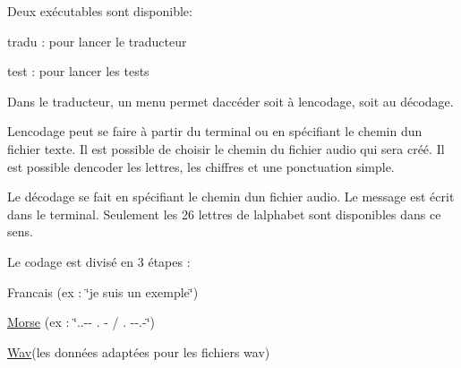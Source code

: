 Deux exécutables sont disponible\+:
\begin{DoxyItemize}
\item tradu \+: pour lancer le traducteur
\item test \+: pour lancer les tests
\end{DoxyItemize}

Dans le traducteur, un menu permet d\textquotesingle{}accéder soit à l\textquotesingle{}encodage, soit au décodage.

L\textquotesingle{}encodage peut se faire à partir du terminal ou en spécifiant le chemin d\textquotesingle{}un fichier texte. Il est possible de choisir le chemin du fichier audio qui sera créé. Il est possible d\textquotesingle{}encoder les lettres, les chiffres et une ponctuation simple.

Le décodage se fait en spécifiant le chemin d\textquotesingle{}un fichier audio. Le message est écrit dans le terminal. Seulement les 26 lettres de l\textquotesingle{}alphabet sont disponibles dans ce sens.

Le codage est divisé en 3 étapes \+:
\begin{DoxyItemize}
\item Francais (ex \+: \char`\"{}je suis un exemple\char`\"{})
\item \mbox{\hyperlink{classMorse}{Morse}} (ex \+: \char`\"{}..-\/-\/ . -\/ / . -\/-\/.-\/\char`\"{})
\item \mbox{\hyperlink{classWav}{Wav}}(les données adaptées pour les fichiers wav) 
\end{DoxyItemize}